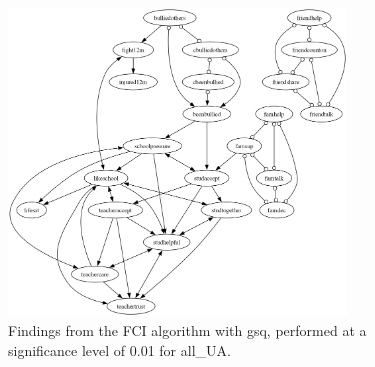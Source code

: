 \begin{figure}[htbp]
    \centering
    \includegraphics[width=0.8\textwidth]{Report/final_report/pictures/FCI_gsq_0.01_all_UA.png}
    \caption{Findings from the FCI algorithm with gsq, performed at a significance level of 0.01 for all_UA.}
    \label{fig:fci_gsq_0.01all_UA}
\end{figure}
